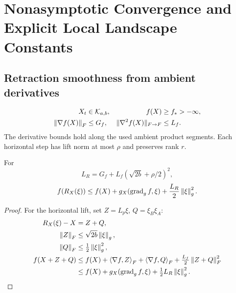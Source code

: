 \section{Nonasymptotic Convergence and Explicit Local Landscape Constants}
\label{app:convergence}
\subsection{Retraction smoothness from ambient derivatives}
\begin{assumption}
\label{ass:rigid-regular}
\begin{align}
X_t&\in\mathcal K_{a,b},&
f(X)&\geq f_*>-\infty,\\
\left\lVert\nabla f(X)\right\rVert_F&\leq G_f,&
\|\nabla^2f(X)\|_{F\to F}&\leq L_f .
\end{align}
The derivative bounds hold along the used ambient product segments.
Each horizontal step has lift norm at most $\rho$ and preserves rank $r$.
\end{assumption}

\begin{lemma}
\label{lem:ambient-smoothness}
For
\begin{equation}
L_R=G_f+L_f(\sqrt{2b}+\rho/2)^2,
\end{equation}
\begin{equation}
f(R_X(\xi))\leq f(X)+g_X(\operatorname{grad}_g f,\xi)
+\frac{L_R}{2}\left\lVert\xi\right\rVert_g^2.
\label{eq:rigid-pullback-descent}
\end{equation}
\end{lemma}
\begin{proof}
For the horizontal lift, set $Z=L_p\xi$, $Q=\xi_B\xi_A$:
\begin{align}
R_X(\xi)-X&=Z+Q,\\
\left\lVert Z\right\rVert_F&\leq\sqrt{2b}\left\lVert\xi\right\rVert_g,\\
\left\lVert Q\right\rVert_F&\leq\tfrac12\left\lVert\xi\right\rVert_g^2,\\
f(X+Z+Q)
&\leq f(X)+\left\langle\nabla f,Z\right\rangle_F+\left\langle\nabla f,Q\right\rangle_F
+\tfrac{L_f}{2}\left\lVert Z+Q\right\rVert_F^2\\
&\leq f(X)+g_X(\operatorname{grad}_g f,\xi)
+\tfrac12L_R\left\lVert\xi\right\rVert_g^2.
\end{align}
\end{proof}

